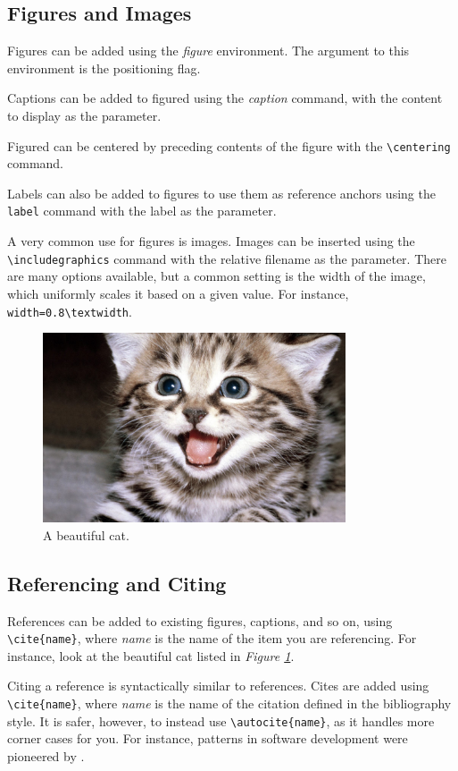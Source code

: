 \subsection{Figures and Images}
Figures can be added using the \textit{figure} environment.  The argument to this environment is the positioning flag.

Captions can be added to figured using the \textit{caption} command, with the content to display as the parameter.

Figured can be centered by preceding contents of the figure with the \verb;\centering; command.

Labels can also be added to figures to use them as reference anchors using the \verb;label; command with the label as the parameter.

A very common use for figures is images.  Images can be inserted using the \verb;\includegraphics; command with the relative filename as the parameter.  There are many options available, but a common setting is the width of the image, which uniformly scales it based on a given value.  For instance, \verb;width=0.8\textwidth;.
\begin{figure}[H]
	\centering
	\includegraphics[width=0.8\textwidth]{cat.jpg}
	\caption{A beautiful cat.}
	\label{fig:beautiful_cat}
\end{figure}

\subsection{Referencing and Citing}
References can be added to existing figures, captions, and so on, using \verb;\cite{name};, where \textit{name} is the name of the item you are referencing.  For instance, look at the beautiful cat listed in \textit{Figure \ref{fig:beautiful_cat}}.

Citing a reference is syntactically similar to references.  Cites are added using \verb;\cite{name};, where \textit{name} is the name of the citation defined in the bibliography style.  It is safer, however, to instead use \verb;\autocite{name};, as it handles more corner cases for you.  For instance, patterns in software development were pioneered by \autocite{gamma1994design}.
